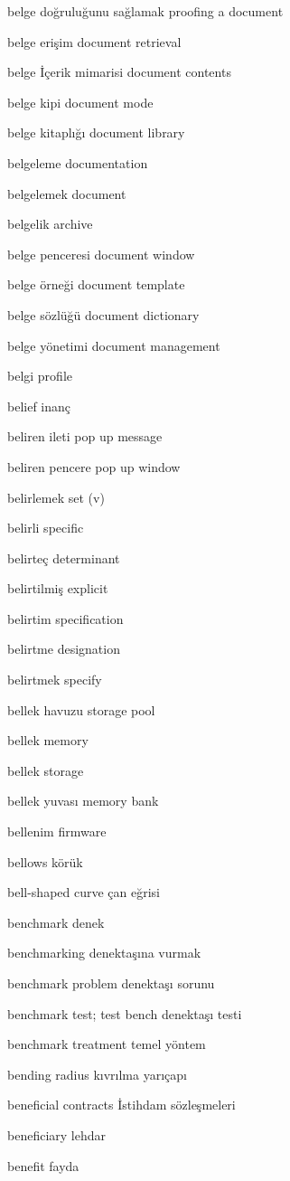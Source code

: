 \documentclass[12pt,fleqn]{article}\usepackage{../../common}
\begin{document}
belge doğruluğunu sağlamak proofing a document

belge erişim document retrieval

belge İçerik mimarisi document contents

belge kipi document mode

belge kitaplığı document library

belgeleme documentation

belgelemek document

belgelik archive

belge penceresi document window

belge örneği document template

belge sözlüğü document dictionary

belge yönetimi document management

belgi profile

belief inanç

beliren ileti pop up message

beliren pencere pop up window

belirlemek set (v)

belirli specific

belirteç determinant

belirtilmiş explicit

belirtim specification

belirtme designation

belirtmek specify

bellek havuzu storage pool

bellek memory

bellek storage

bellek yuvası memory bank

bellenim firmware

bellows körük

bell-shaped curve çan eğrisi

benchmark denek

benchmarking denektaşına vurmak

benchmark problem denektaşı sorunu

benchmark test; test bench denektaşı testi

benchmark treatment temel yöntem

bending radius kıvrılma yarıçapı

beneficial contracts İstihdam sözleşmeleri

beneficiary lehdar

benefit fayda
\end{document}
